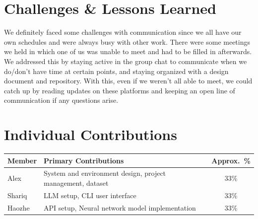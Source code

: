 \documentclass[11pt, letterpaper]{article}
\begin{document}
\section{Challenges \& Lessons Learned}
\begin{tcolorbox}[sectionbox, height=4.4cm, valign=top]  
    We definitely faced some challenges with communication since we all have our own schedules and were always busy with other work. There were some meetings we held in which one of us was unable to meet and had to be filled in afterwards. We addressed this by staying active in the group chat to communicate when we do/don't have time at certain points, and staying organized with a design document and repository. With this, even if we weren't all able to meet, we could catch up by reading updates on these platforms and keeping an open line of communication if any questions arise. 
\end{tcolorbox}

\section{Individual Contributions}
\begin{tcolorbox}[sectionbox, height=4.3cm, valign=top]
  \vspace{4pt}
  \centering
  \begin{tabularx}{0.95\textwidth}{l X c}
    \toprule
    \textbf{Member} & \textbf{Primary Contributions} & \textbf{Approx.\ \%} \\
    \midrule
    Alex & System and environment design, project management, dataset & 33\% \\
    Shariq & LLM setup, CLI user interface & 33\% \\
    Haozhe & API setup, Neural network model implementation & 33\% \\
    \bottomrule
  \end{tabularx}
\end{tcolorbox}

\end{document}
